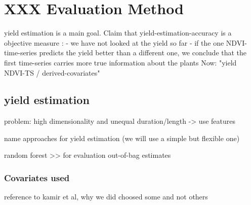 \section{XXX Evaluation Method}{
    {
        yield estimation is a main goal. 
        Claim that yield-estimation-accuracy is a objective measure :
            - we have not looked at the yield so far 
            - if the one NDVI-time-series predicts the yield better than a different one, we conclude that the first time-series carries more true information about the plants
        Now: "yield ~ NDVI-TS / derived-covariates" 
    }
    
    \subsection{yield estimation}{
        problem: high dimensionality and unequal duration/length -> use features
        
        name approaches for yield estimation (we will use a simple but flexible one)
        
        random forest >> for evaluation out-of-bag estimates
    }
    \subsubsection{Covariates used}{
        reference to kamir et al, why we did choosed some and not others
    }
    
}



